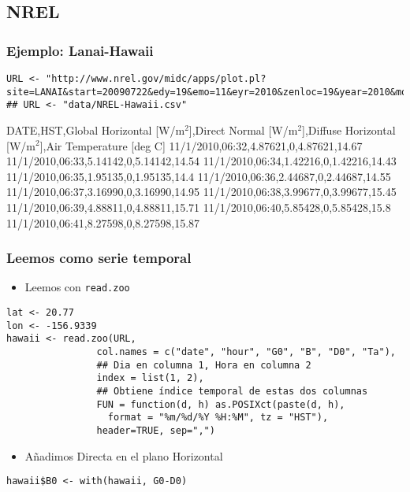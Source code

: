 \documentclass[bigger]{beamer}
\begin{document}
\subsection{NREL}
\label{sec-3-1}
\begin{frame}[fragile]
\frametitle{Ejemplo: Lanai-Hawaii}
\label{sec-3-1-1}



\lstset{language=R}
\begin{lstlisting}
URL <- "http://www.nrel.gov/midc/apps/plot.pl?site=LANAI&start=20090722&edy=19&emo=11&eyr=2010&zenloc=19&year=2010&month=11&day=1&endyear=2010&endmonth=11&endday=19&time=1&inst=3&inst=4&inst=5&inst=10&type=data&first=3&math=0&second=-1&value=0.0&global=-1&direct=-1&diffuse=-1&user=0&axis=1"
## URL <- "data/NREL-Hawaii.csv"
\end{lstlisting}

DATE,HST,Global Horizontal [W/m$^2$],Direct Normal [W/m$^2$],Diffuse Horizontal [W/m$^2$],Air Temperature [deg C]
11/1/2010,06:32,4.87621,0,4.87621,14.67
11/1/2010,06:33,5.14142,0,5.14142,14.54
11/1/2010,06:34,1.42216,0,1.42216,14.43
11/1/2010,06:35,1.95135,0,1.95135,14.4
11/1/2010,06:36,2.44687,0,2.44687,14.55
11/1/2010,06:37,3.16990,0,3.16990,14.95
11/1/2010,06:38,3.99677,0,3.99677,15.45
11/1/2010,06:39,4.88811,0,4.88811,15.71
11/1/2010,06:40,5.85428,0,5.85428,15.8
11/1/2010,06:41,8.27598,0,8.27598,15.87
\end{frame}
\begin{frame}[fragile]
\frametitle{Leemos como serie temporal}
\label{sec-3-1-2}

\begin{itemize}
\item Leemos con \texttt{read.zoo}
\end{itemize}

\lstset{language=R}
\begin{lstlisting}
lat <- 20.77
lon <- -156.9339
hawaii <- read.zoo(URL,
                col.names = c("date", "hour", "G0", "B", "D0", "Ta"),
                ## Dia en columna 1, Hora en columna 2
                index = list(1, 2),
                ## Obtiene índice temporal de estas dos columnas
                FUN = function(d, h) as.POSIXct(paste(d, h),
                  format = "%m/%d/%Y %H:%M", tz = "HST"), 
                header=TRUE, sep=",")
\end{lstlisting}
\begin{itemize}
\item Añadimos Directa en el plano Horizontal
\end{itemize}

\lstset{language=R}
\begin{lstlisting}
hawaii$B0 <- with(hawaii, G0-D0)
\end{lstlisting}
\end{frame}
\end{document}
